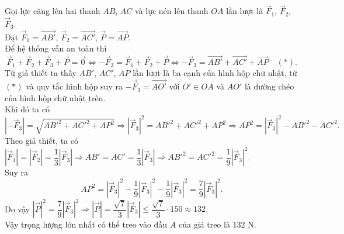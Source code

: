 \begin{ex}
{\begin{center}
\begin{tikzpicture}[>=stealth, line join=round, line cap=round, font=\footnotesize, scale=1]
			\end{tikzpicture}
		\end{center}
		Gọi lực căng lên hai thanh $AB$, $AC$ và lực nén lên thanh $OA$ lần lượt là $\overrightarrow{F}_1$, $\overrightarrow{F}_2$, $\overrightarrow{F}_3$.\\
		Đặt $\overrightarrow{F}_1 = \overrightarrow{AB'}$, $\overrightarrow{F}_2 = \overrightarrow{AC'}$, $\overrightarrow{P} = \overrightarrow{AP}$.\\
		Để hệ thống vẫn an toàn thì
		\[\overrightarrow{F}_1 + \overrightarrow{F}_2 + \overrightarrow{F}_3 + \overrightarrow{P} = \overrightarrow{0} \Leftrightarrow -\overrightarrow{F}_3 = \overrightarrow{F}_1 + \overrightarrow{F}_2 + \overrightarrow{P} \Leftrightarrow -\overrightarrow{F}_3 = \overrightarrow{AB'} + \overrightarrow{AC'} + \overrightarrow{AP} \quad (*).\]
		Từ giả thiết ta thấy $AB'$, $AC'$, $AP$ lần lượt là ba cạnh của hình hộp chữ nhật, từ $(*)$ và quy tắc hình hộp suy ra $-\overrightarrow{F}_3 = \overrightarrow{AO'}$ với $O' \in OA$ và $AO'$ là đường chéo của hình hộp chữ nhật trên.\\
		Khi đó ta có
		\[\left| -\overrightarrow{F}_3 \right| = \sqrt{AB'^2 + AC'^2 + AP^2} \Rightarrow \left| \overrightarrow{F}_3 \right|^2 = AB'^2 + AC'^2 + AP^2 \Rightarrow AP^2 = \left| \overrightarrow{F}_3 \right|^2 - AB'^2 - AC'^2.\]
		Theo giả thiết, ta có $\left| \overrightarrow{F}_1 \right| = \left| \overrightarrow{F}_2 \right| = \dfrac{1}{3}\left| \overrightarrow{F}_3 \right| \Rightarrow AB' = AC' = \dfrac{1}{3}\left| \overrightarrow{F}_3 \right| \Rightarrow AB'^2 = AC'^2 = \dfrac{1}{9}\left| \overrightarrow{F}_3 \right|^2$.\\
		Suy ra
		\[AP^2 = \left| \overrightarrow{F}_3 \right|^2 - \dfrac{1}{9}\left| \overrightarrow{F}_3 \right|^2 - \dfrac{1}{9}\left| \overrightarrow{F}_3 \right|^2 = \dfrac{7}{9}\left| \overrightarrow{F}_3 \right|^2.\]
		Do vậy $\left| \overrightarrow{P} \right|^2 = \dfrac{7}{9}\left| \overrightarrow{F}_3 \right|^2 \Rightarrow \left| \overrightarrow{P} \right| = \dfrac{\sqrt{7}}{3}\left| \overrightarrow{F}_3 \right| \le \dfrac{\sqrt{7}}{3} \cdot 150 \approx 132$.\\
		Vậy trọng lượng lớn nhất có thể treo vào đầu $A$ của giá treo là $132$ N.
	}
\end{ex}

